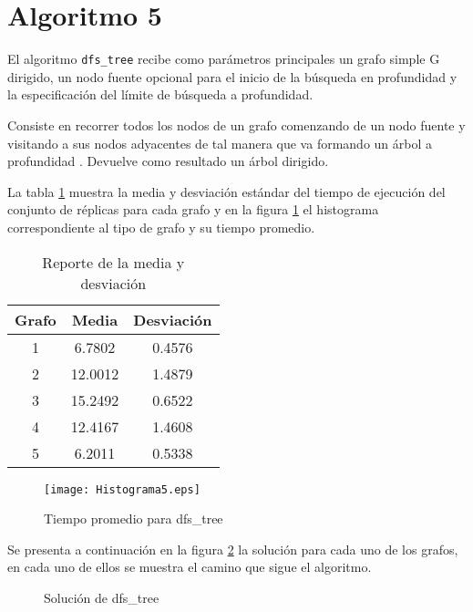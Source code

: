 \documentclass{article}
\begin{document}
\newpage
\section*{Algoritmo 5}

El algoritmo \texttt{dfs\_tree} recibe como parámetros principales un grafo simple G dirigido, un nodo fuente opcional para el inicio de la búsqueda en profundidad y la especificación del límite de búsqueda a profundidad.

Consiste en recorrer todos los nodos de un grafo comenzando de un nodo fuente y visitando a sus nodos adyacentes de tal manera que va formando un árbol a profundidad
.
Devuelve como resultado un árbol dirigido. 

La tabla \ref{Tabla5} muestra la media y desviación estándar del tiempo de ejecución del conjunto de réplicas para cada grafo y en la figura \ref{Figura5} el histograma correspondiente al tipo de grafo y su tiempo promedio.

\begin{table}[h]
\centering
\begin{tabular}{|c|c|c|}
\hline
\textbf{Grafo} & \textbf{Media} & \textbf{Desviación} \\ \hline
1              & 6.7802         & 0.4576              \\ \hline
2              & 12.0012        & 1.4879              \\ \hline
3              & 15.2492        & 0.6522              \\ \hline
4              & 12.4167        & 1.4608              \\ \hline
5              & 6.2011         & 0.5338              \\ \hline
\end{tabular}
\caption{Reporte de la media y desviación} 
\label{Tabla5}
\end{table}

\begin{figure}[h]
\centering
\texttt{[image: Histograma5.eps]}  
\caption{Tiempo promedio para dfs\_tree}
\label{Figura5}
\end{figure}

Se presenta a continuación en la figura \ref{Grafos5} la solución para cada uno de los grafos, en cada uno de ellos se muestra el camino que sigue el algoritmo.



\begin{figure}[H]
\centering
{}\hspace{5mm}
\vspace{5mm}
\hspace{5mm}
\vspace{5mm}
\caption{Solución de dfs\_tree} \label{Grafos5}
\end{figure}
\end{document}
